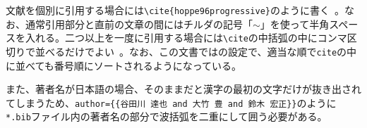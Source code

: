 文献を個別に引用する場合には\texttt{\textbackslash cite\{hoppe96progressive\}}のように書く~\cite{hoppe96progressive}。なお、通常引用部分と直前の文章の間にはチルダの記号「$\sim$」を使って半角スペースを入れる。二つ以上を一度に引用する場合には\texttt{\textbackslash cite}の中括弧の中にコンマ区切りで並べるだけでよい~\cite{garland97surface,kazhdan06poisson, hoppe96progressive,qi2017pointnetpp}。なお、この文書では\biblatex の設定で、適当な順で\texttt{cite}の中に並べても番号順にソートされるようになっている。

また、著者名が日本語の場合、そのままだと漢字の最初の文字だけが抜き出されてしまうため、\texttt{author=\{\{谷田川 達也 and 大竹 豊 and 鈴木 宏正\}\}}のように\texttt{*.bib}ファイル内の著者名の部分で波括弧を二重にして囲う必要がある。
